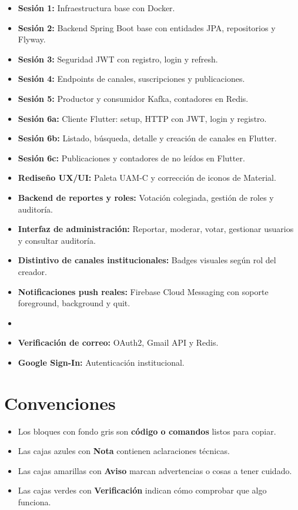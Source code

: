 \begin{itemize}[leftmargin=*]
  \item \textbf{Sesión 1:} Infraestructura base con Docker.
  \item \textbf{Sesión 2:} Backend Spring Boot base con entidades JPA, repositorios y Flyway.
  \item \textbf{Sesión 3:} Seguridad JWT con registro, login y refresh.
  \item \textbf{Sesión 4:} Endpoints de canales, suscripciones y publicaciones.
  \item \textbf{Sesión 5:} Productor y consumidor Kafka, contadores en Redis.
  \item \textbf{Sesión 6a:} Cliente Flutter: setup, HTTP con JWT, login y registro.
  \item \textbf{Sesión 6b:} Listado, búsqueda, detalle y creación de canales en Flutter.
  \item \textbf{Sesión 6c:} Publicaciones y contadores de no leídos en Flutter.
  \item \textbf{Rediseño UX/UI:} Paleta UAM-C y corrección de iconos de Material.
  \item \textbf{Backend de reportes y roles:} Votación colegiada, gestión de roles y auditoría.
  \item \textbf{Interfaz de administración:} Reportar, moderar, votar, gestionar usuarios y consultar auditoría.
  \item \textbf{Distintivo de canales institucionales:} Badges visuales según rol del creador.
  \item \textbf{Notificaciones push reales:} Firebase Cloud Messaging con soporte foreground, background y quit.
  \item   \item \textbf{Verificación de correo:} OAuth2, Gmail API y Redis.
  \item \textbf{Google Sign-In:} Autenticación institucional.
\end{itemize}

\section{Convenciones}

\begin{itemize}[leftmargin=*]
  \item Los bloques con fondo gris son \textbf{código o comandos} listos para copiar.
  \item Las cajas azules con \textbf{Nota} contienen aclaraciones técnicas.
  \item Las cajas amarillas con \textbf{Aviso} marcan advertencias o cosas a tener cuidado.
  \item Las cajas verdes con \textbf{Verificación} indican cómo comprobar que algo funciona.
\end{itemize}